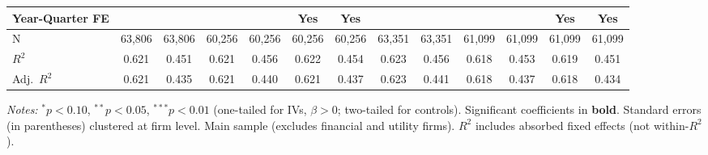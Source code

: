 \documentclass[11pt,a4paper]{article}
\begin{document}
\begin{table}[htbp]
\begin{tabular}{lcccccccccccc}
Year-Quarter FE &  &  &  &  & Yes & Yes &  &  &  &  & Yes & Yes \\
\midrule
N & 63,806 & 63,806 & 60,256 & 60,256 & 60,256 & 60,256 & 63,351 & 63,351 & 61,099 & 61,099 & 61,099 & 61,099 \\
$R^2$ & 0.621 & 0.451 & 0.621 & 0.456 & 0.622 & 0.454 & 0.623 & 0.456 & 0.618 & 0.453 & 0.619 & 0.451 \\
Adj.~$R^2$ & 0.621 & 0.435 & 0.621 & 0.440 & 0.621 & 0.437 & 0.623 & 0.441 & 0.618 & 0.437 & 0.618 & 0.434 \\
\bottomrule
\end{tabular}
\begin{minipage}{\linewidth}
\vspace{2pt}\scriptsize
\textit{Notes:} $^{*}p<0.10$, $^{**}p<0.05$, $^{***}p<0.01$ (one-tailed for IVs, $\beta > 0$; two-tailed for controls).
 Significant coefficients in \textbf{bold}.
 Standard errors (in parentheses) clustered at firm level.
 Main sample (excludes financial and utility firms).
 $R^2$ includes absorbed fixed effects (not within-$R^2$).
\end{minipage}
\end{table}
\clearpage
\end{document}
